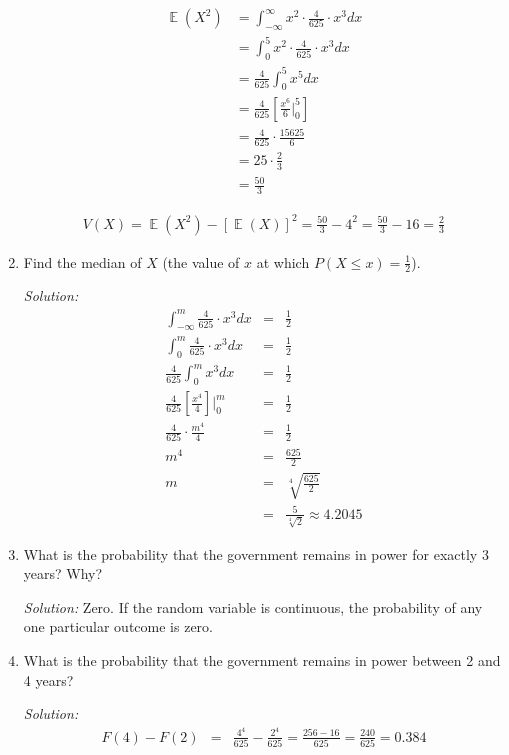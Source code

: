 \documentclass[11pt]{article}
\DeclareMathOperator*{\E}{\mathbb{E}}
\begin{document}
\begin{enumerate}
\begin{align*}
\E(X^2) &= \int_{-\infty}^\infty x^2 \cdot \frac{4}{625} \cdot x^3 dx\\
&= \int_{0}^5 x^2 \cdot \frac{4}{625} \cdot x^3 dx \\
&= \frac{4}{625} \int_0^5 x^5 dx \\
&= \frac{4}{625} \left[ \frac{x^6}{6} \Big|_0^5 \right]\\ 
&= \frac{4}{625} \cdot \frac{15625}{6} \\
&= 25 \cdot \frac{2}{3} \\
&= \frac{50}{3}
\end{align*}

\begin{eqnarray*}
V(X) = \E(X^2) - [\E(X)]^2 = \frac{50}{3} - 4^2 = \frac{50}{3}-16 = \frac{2}{3}
\end{eqnarray*}

\pagebreak
\item Find the median of $X$ (the value of $x$ at which $P(X \leq x) = \frac{1}{2}$).

{\it Solution:}
\begin{eqnarray*}
\int_{-\infty}^m \frac{4}{625} \cdot x^3 dx &=& \frac{1}{2} \\
\int_{0}^m \frac{4}{625} \cdot x^3 dx &=& \frac{1}{2} \\
\frac{4}{625} \int_{0}^m x^3 dx &=& \frac{1}{2} \\
\frac{4}{625} \left[ \frac{x^4}{4} \right]\bigg|_0^m &=& \frac{1}{2} \\
\frac{4}{625} \cdot \frac{m^4}{4} &=& \frac{1}{2} \\
m^4 &=& \frac{625}{2} \\
m &=& \sqrt[4]{\frac{625}{2}} \\
&=& \frac{5}{\sqrt[4]{2}} \approx 4.2045
\end{eqnarray*}

\medskip

\item What is the probability that the government remains in power for exactly 3 years? Why?

{\it Solution:} Zero. If the random variable is continuous, the probability of any one particular outcome is zero.

\medskip

\item What is the probability that the government remains in power between 2 and 4 years?

{\it Solution:} 
\begin{eqnarray*}
F(4) - F(2) &=& \frac{4^4}{625} - \frac{2^4}{625} = \frac{256-16}{625} = \frac{240}{625} = 0.384
\end{eqnarray*}


\end{enumerate}
\end{document}
